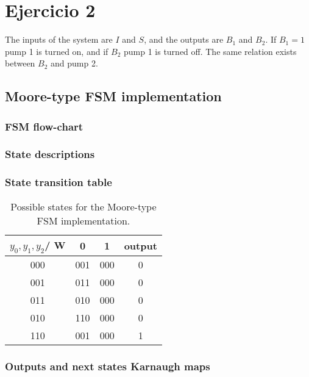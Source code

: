 \documentclass[../../e3_tp3_main.tex]{subfiles}
\begin{document}
\chapter{Ejercicio 2}

The inputs of the system are $I$ and $S$, and the outputs are $B_1$ and $B_2$. If $B_1=1$ pump 1 is turned on, and if $B_2$ pump 1 is turned off. The same relation exists between $B_2$ and pump 2.

\section{Moore-type FSM implementation}
\subsection{FSM flow-chart}

\subsection{State descriptions}



\subsection{State transition table}

\begin{table}[H]	%
	\centering
	\begin{tabular}{|c|c|c|c|}
	\hline 
	$y_0,y_1,y_2$/ W & 0 & 1 & output\\ 
	\hline 
	000 & 001 & 000 & 0\\ 
	\hline 
	001 & 011 & 000 & 0\\ 
	\hline 
	011 & 010 & 000 & 0\\ 
	\hline 
	010 & 110 & 000 & 0\\ 
	\hline 
	110 & 001 & 000 & 1\\ 
	\hline 
	\end{tabular} 
	\caption{Possible states for the Moore-type FSM implementation.}
	\label{tab:ej3_moore_states}
\end{table}


\subsection{Outputs and next states Karnaugh maps}
\end{document}
